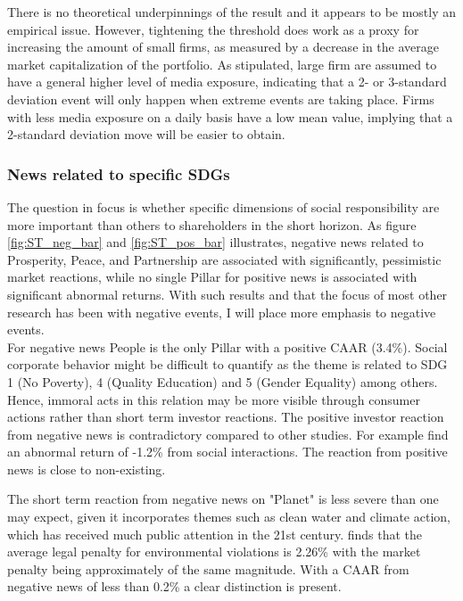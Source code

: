 There is no theoretical underpinnings of the result and it appears to be mostly an empirical issue. However, tightening the threshold does work as a proxy for increasing the amount of small firms,  as measured by a decrease in the average market capitalization of the portfolio. As stipulated, large firm are assumed to have a general higher level of media exposure, indicating that a 2- or 3-standard deviation event will only happen when extreme events are taking place. Firms with less media exposure on a daily basis have a low mean value, implying that a 2-standard deviation move will be easier to obtain.  


\subsubsection{News related to specific SDGs}

The question in focus is whether specific dimensions of social responsibility are more important than others to shareholders in the short horizon. As figure \ref{fig:ST_neg_bar} and \ref{fig:ST_pos_bar} illustrates, negative news related to Prosperity, Peace, and Partnership are associated with significantly, pessimistic market reactions, while no single Pillar for positive news is associated with significant abnormal returns. With such results and that the focus of most other research has been with negative events, I will place more emphasis to negative events. \\

For negative news People is the only Pillar with a positive CAAR (3.4\%).  Social corporate behavior might be difficult to quantify as the theme is related to SDG 1 (No Poverty), 4 (Quality Education) and 5 (Gender Equality) among others. Hence, immoral acts in this relation may be more visible through consumer actions rather than short term investor reactions. The positive investor reaction from negative news is contradictory compared to other studies. For example \cite{chen2001layoffs} find an abnormal return of -1.2\% from social interactions. The reaction from positive news is close to non-existing. 

The short term reaction from negative news on "Planet" is less severe than one may expect, given it incorporates themes such as clean water and climate action, which has received much public attention in the 21st century. \cite{karpoff2005reputational} finds that the average legal penalty for environmental violations is 2.26\% with the market penalty being approximately of the same magnitude. With a CAAR from negative news of less than 0.2\% a clear distinction is present. 

